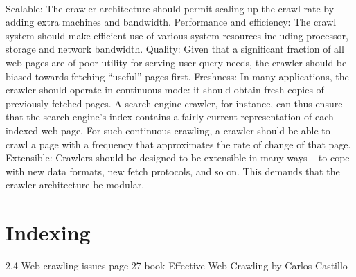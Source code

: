 \\



Scalable: The crawler architecture should permit scaling up the crawl rate
by adding extra machines and bandwidth.
Performance and efficiency: The crawl system should make efficient use of
various system resources including processor, storage and network bandwidth.
Quality: Given that a significant fraction of all web pages are of poor utility for serving user query needs, the crawler should be biased towards
fetching “useful” pages first.
Freshness: In many applications, the crawler should operate in continuous
mode: it should obtain fresh copies of previously fetched pages. A search
engine crawler, for instance, can thus ensure that the search engine’s index
contains a fairly current representation of each indexed web page. For
such continuous crawling, a crawler should be able to crawl a page with
a frequency that approximates the rate of change of that page.
Extensible: Crawlers should be designed to be extensible in many ways –
to cope with new data formats, new fetch protocols, and so on. This demands that the crawler architecture be modular.

\section{Indexing}
2.4 Web crawling issues page 27 book Effective Web Crawling by Carlos Castillo
